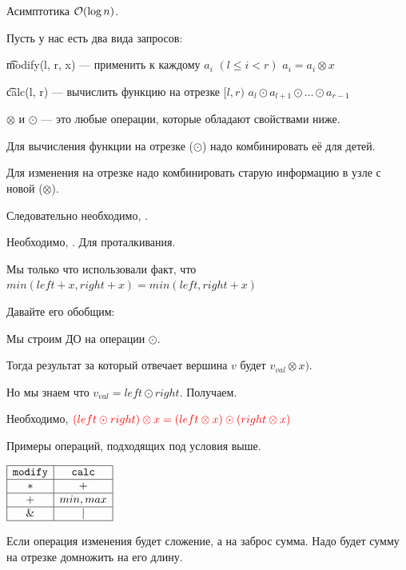Асимптотика $\mathcal{O}(\log n)$.


Пусть у нас есть два вида запросов:

\begin{MyList}[0pt]
	\item \t{modify(l, r, x)} --- применить к каждому $a_i$ $(l \le i < r)$ $a_i = a_i \otimes x$
	\item \t{calc(l, r)} --- вычислить функцию на отрезке $[l, r)$ $a_l \odot a_{l + 1} \odot \ldots \odot a_{r - 1}$
\end{MyList}

$\otimes$ и $\odot$ — это любые операции, которые обладают свойствами ниже.
\down

Для вычисления функции на отрезке ($\odot$) надо комбинировать её для детей.

Для изменения на отрезке надо комбинировать старую информацию в узле с новой ($\otimes$).

Следовательно необходимо, .
\down

Необходимо, . Для проталкивания.
\down

Мы только что использовали факт, что $min(left + x, right + x) = min(left, right + x)$

Давайте его обобщим:

Мы строим ДО на операции $\odot$.

Тогда результат за который отвечает вершина $v$ будет $v_{val} \otimes x)$.

Но мы знаем что $v_{val} = left \odot right$. Получаем.

Необходимо, ${\color{red}{(left \odot right) \otimes x = (left \otimes x) \odot (right \otimes x)}}$
\down

Примеры операций, подходящих под условия выше.

\begin{center}
	$\begin{array}{| c | c |} \hline \texttt{modify} & \texttt{calc} \\ \hline * & + \\ \hline + & min, max \\ \hline \& & | \\ \hline \end{array}$
\end{center}

Если операция изменения будет сложение, а на заброс сумма. Надо будет сумму на отрезке домножить на его длину.

